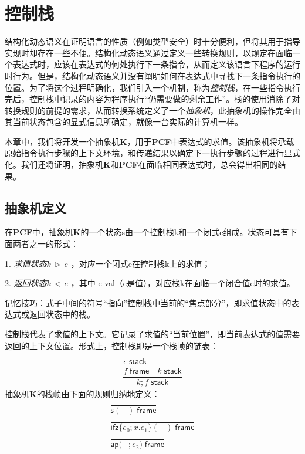 \chapter{控制栈}
结构化动态语义在证明语言的性质（例如类型安全）时十分便利，但将其用于指导实现时却存在一些不便。结构化动态语义通过定义一些转换规则，以规定在面临一个表达式时，应该在表达式的何处执行下一条指令，从而定义该语言下程序的运行时行为。但是，结构化动态语义并没有阐明如何在表达式中寻找下一条指令执行的位置。为了将这个过程明确化，我们引入一个机制，称为\textit{控制栈}，在一些指令执行完后，控制栈中记录的内容为程序执行“仍需要做的剩余工作”。栈的使用消除了对转换规则的前提的需求，从而转换系统定义了一个\textit{抽象机}，此抽象机的操作完全由其当前状态包含的显式信息所确定，就像一台实际的计算机一样。

本章中，我们将开发一个抽象机\textbf{K}，用于\textbf{PCF}中表达式的求值。该抽象机将承载原始指令执行步骤的上下文环境，和传递结果以确定下一执行步骤的过程进行显式化。我们还将证明，抽象机\textbf{K}和\textbf{PCF}在面临相同表达式时，总会得出相同的结果。

\section{抽象机定义}
在\textbf{PCF}中，抽象机\textbf{K}的一个状态s由一个控制栈k和一个闭式e组成。状态可具有下面两者之一的形式：

1. \textit{求值状态}$k\,\triangleright\,e$ ，对应一个闭式e在控制栈k上的求值；

2. \textit{返回状态}$k\,\triangleleft\,e$ ，其中 e val（e是值），对应栈k在面临一个闭合值e时的求值。

记忆技巧：式子中间的符号“指向”控制栈中当前的“焦点部分”，即求值状态中的表达式或返回状态中的栈。

控制栈代表了求值的上下文。它记录了求值的“当前位置”，即当前表达式的值需要返回的上下文位置。形式上，控制栈即是一个栈帧的链表：
\begin{subequations}
    \begin{gather}
       \dfrac{}{\epsilon \; \mathsf{stack}}\\
       \dfrac{f \; \mathsf{frame} \quad k\;\mathsf{stack}}{k;f\;\mathsf{stack}}
    \end{gather}
\end{subequations}
抽象机\textbf{K}的栈帧由下面的规则归纳地定义：
\begin{subequations}
    \begin{gather}
       \dfrac{}{\mathsf{s(-)} \; \mathsf{frame}}\\
       \dfrac{}{\mathsf{ifz} \{ e_0;x.e_1 \} \mathsf{(-)} \; \mathsf{frame}}\\
       \dfrac{}{\mathsf{ap(-;} e_2 \mathsf{)} \; \mathsf{frame}}
    \end{gather}
\end{subequations}

